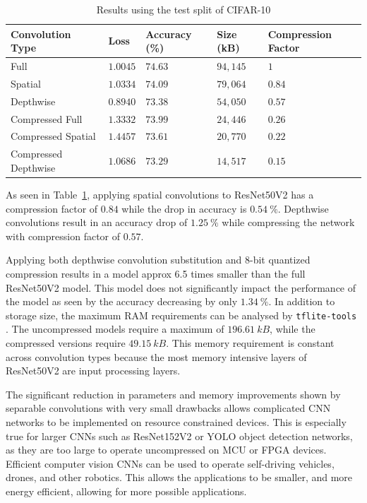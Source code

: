 \documentclass{article}
\begin{document}
	\begin{table}[h!]
		\caption{Results using the test split of CIFAR-10}
		\label{tbl:results}
		\centering
		\begin{tabular}{lllll}
			\toprule
			Convolution Type     & Loss     & Accuracy (\%)    & Size (kB) & Compression Factor \\ \midrule
			Full                 & $1.0045$ & $74.63$          & $94,145$  & $1$                \\
			Spatial              & $1.0334$ & $74.09$          & $79,064$  & $0.84$             \\
			Depthwise            & $0.8940$ & $73.38$          & $54,050$  & $0.57$             \\
			Compressed Full      & $1.3332$ & $73.99$          & $24,446$  & $0.26$             \\
			Compressed Spatial   & $1.4457$ & $73.61$          & $20,770$  & $0.22$             \\
			Compressed Depthwise & $1.0686$ & $\mathbf{73.29}$ & $14,517$  & $\mathbf{0.15}$    \\ \bottomrule
		\end{tabular}
	\end{table}

	As seen in Table~\ref{tbl:results}, applying spatial convolutions to ResNet50V2 has a compression factor of $0.84$ while the drop in accuracy is $0.54~\%$. Depthwise convolutions result in an accuracy drop of $1.25~\%$ while compressing the network with compression factor of $0.57$.
	
	Applying both depthwise convolution substitution and 8-bit quantized compression results in a model approx 6.5 times smaller than the full ResNet50V2 model. This model does not significantly impact the performance of the model as seen by the accuracy decreasing by only $1.34~\%$. In addition to storage size, the maximum RAM requirements can be analysed by \verb|tflite-tools| \cite{tflietools}. The uncompressed models require a maximum of $196.61~kB$, while the compressed versions require $49.15~kB$. This memory requirement is constant across convolution types because the most memory intensive layers of ResNet50V2 are input processing layers.
	
	The significant reduction in parameters and memory improvements shown by separable convolutions with very small drawbacks allows complicated CNN networks to be implemented on resource constrained devices. This is especially true for larger CNNs such as ResNet152V2 or YOLO object detection networks, as they are too large to operate uncompressed on MCU or FPGA devices. Efficient computer vision CNNs can be used to operate self-driving vehicles, drones, and other robotics. This allows the applications to be smaller, and more energy efficient, allowing for more possible applications. 
	
\end{document}
